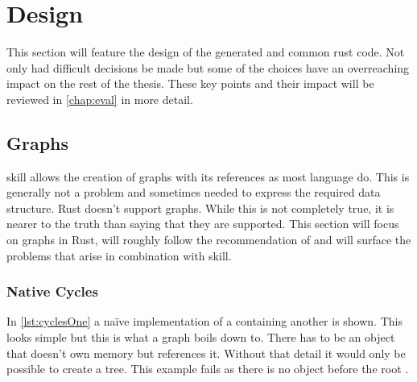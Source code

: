 \documentclass[thesis]{subfiles}
\begin{document}
\chapter{Design}
This section will feature the design of the generated and common rust code.
Not only had difficult decisions be made but some of the choices have an overreaching impact on the rest of the thesis.
These key points and their impact will be reviewed in \autoref{chap:eval} in more detail.

\section{Graphs}\label{sec:graph}
  \gls{skill} allows the creation of graphs with its references as most language do.
  This is generally not a problem and sometimes needed to express the required data structure.
  Rust doesn't support graphs.
  While this is not completely true, it is nearer to the truth than saying that they are supported.
  This section will focus on graphs in Rust, will roughly follow the recommendation of \autocite{rust-faq} and will surface the problems that arise in combination with \gls{skill}.

  \subsection{Native Cycles}
    In \autoref{lst:cyclesOne} a na\"ive implementation of a \Node containing another \Node is shown.
    This looks simple but this is what a graph boils down to.
    There has to be an object that doesn't own memory but references it.
    Without that detail it would only be possible to create a tree.
    This example fails as there is no \Node object before the root \Node {}.

    \newsavebox{\cyclesOne}
    \begin{lrbox}{\cyclesOne}%
      \begin{minipage}{.45\linewidth}
        
      \end{minipage}
    \end{lrbox}

    \newsavebox{\cyclesTwo}
    \begin{lrbox}{\cyclesTwo}
      \begin{minipage}{.475\linewidth}
        
      \end{minipage}
    \end{lrbox}
\end{document}
